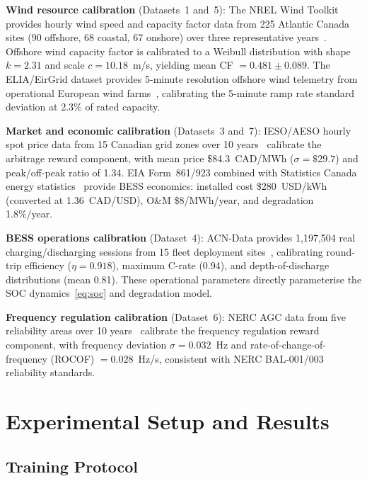 \documentclass[journal]{IEEEtran}
\begin{document}
\textbf{Wind resource calibration} (Datasets~1 and~5): The NREL
Wind Toolkit provides hourly wind speed and capacity factor data from
225 Atlantic Canada sites (90 offshore, 68 coastal, 67 onshore) over
three representative years~\cite{draxl2015wind}. Offshore wind
capacity factor is calibrated to a Weibull distribution with shape
$k = 2.31$ and scale $c = 10.18$~m/s, yielding mean CF
$= 0.481 \pm 0.089$. The ELIA/EirGrid dataset provides 5-minute
resolution offshore wind telemetry from operational European wind
farms~\cite{elia2024,eirgrid2024}, calibrating the 5-minute ramp rate
standard deviation at 2.3\% of rated capacity.

\textbf{Market and economic calibration} (Datasets~3 and~7):
IESO/AESO hourly spot price data from 15 Canadian grid zones over 10
years~\cite{ieso2024,aeso2024} calibrate the arbitrage reward
component, with mean price \$84.3~CAD/MWh ($\sigma = \$29.7$) and
peak/off-peak ratio of 1.34. EIA Form~861/923 combined with Statistics
Canada energy statistics~\cite{eia2024,statcan2024} provide BESS
economics: installed cost \$280~USD/kWh (converted at 1.36~CAD/USD),
O\&M \$8/MWh/year, and degradation 1.8\%/year.

\textbf{BESS operations calibration} (Dataset~4): ACN-Data provides
1,197,504 real charging/discharging sessions from 15 fleet deployment
sites~\cite{lee2019acn}, calibrating round-trip efficiency
($\eta = 0.918$), maximum C-rate (0.94), and depth-of-discharge
distributions (mean 0.81). These operational parameters directly
parameterise the SOC dynamics~\eqref{eq:soc} and degradation model.

\textbf{Frequency regulation calibration} (Dataset~6): NERC AGC
data from five reliability areas over 10 years~\cite{nerc2024}
calibrate the frequency regulation reward component, with frequency
deviation $\sigma = 0.032$~Hz and rate-of-change-of-frequency
(ROCOF) $= 0.028$~Hz/s, consistent with NERC BAL-001/003 reliability
standards.

\section{Experimental Setup and Results}

\subsection{Training Protocol}
\end{document}
